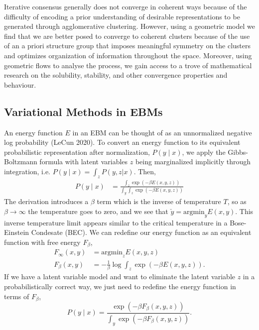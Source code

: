 \documentclass{article}
\begin{document}
    Iterative consensus generally does not converge in coherent ways because of the difficulty of encoding a prior understanding of desirable representations to be generated through agglomerative clustering. However, using a geometric model we find that we are better posed to converge to coherent clusters because of the use of an a priori structure group that imposes meaningful symmetry on the clusters and optimizes organization of information throughout the space. Moreover, using geometric flows to analyse the process, we gain access to a trove of mathematical research on the solubility, stability, and other convergence properties and behaviour.
    
\subsection{Variational Methods in EBMs}
    An energy function $E$ in an EBM can be thought of as an unnormalized negative log probability (LeCun 2020). 
    To convert an energy function to its equivalent probabilistic representation after normalization,
    $P(y \mid x)$, we apply the Gibbs-Boltzmann formula with latent variables $z$ being marginalized implicitly through integration, i.e. $P(y \mid x) = \int_z P(y,z | x)$. Then,
    \begin{align*}
        P(y \mid x) &= \frac{ \int_z \exp(-\beta E(x,y,z)) }{ \int_y \int_z \exp(-\beta E(x, y, z))} 
    \end{align*}
    The derivation introduces a $\beta$ term which is the inverse of temperature $T$, so as $\beta \rightarrow \infty$ the temperature goes to zero, and we see that $\check{y} = \text{argmin}_{y} E(x,y)$. This inverse temperature limit appears similar to the critical temperature in a Bose-Einstein Condesate (BEC). We can redefine our energy function as an equivalent function with free energy $F_\beta$,
    \begin{align*}
        F_{\infty} (x,y) &= \text{argmin}_z E(x,y,z)\\
        F_{\beta} (x,y) &= -\frac{1}{\beta} \log \int_z \exp(-\beta E(x,y,z)).
    \end{align*}
    If we have a latent variable model and want to eliminate the latent variable $z$ in a probabilistically correct way, we just need to redefine the energy function in terms of $F_\beta$,
    \begin{equation}
         P(y \mid x) = \frac{ \exp(-\beta F_\beta(x,y,z)) }{ \int_y \exp(-\beta F_\beta(x, y, z))}.
    \end{equation}
\end{document}
